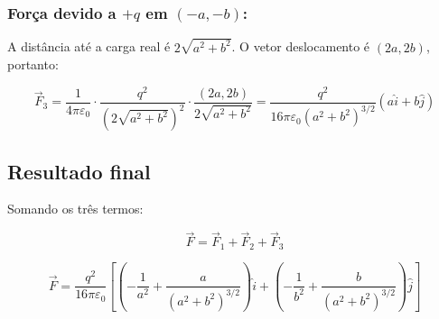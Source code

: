 \documentclass[a4paper,12pt]{article}
\begin{document}
\begin{flushleft}
\subsubsection*{Força devido a \(+q\) em \((-a, -b)\):}

A distância até a carga real é \(2\sqrt{a^2 + b^2}\). O vetor deslocamento é \((2a, 2b)\), portanto:

\begin{equation}
\vec{F}_3 = \frac{1}{4\pi\varepsilon_0} \cdot \frac{q^2}{(2\sqrt{a^2 + b^2})^2} \cdot \frac{(2a, 2b)}{2\sqrt{a^2 + b^2}} 
= \frac{q^2}{16\pi\varepsilon_0 (a^2 + b^2)^{3/2}} (a\hat{i} + b\hat{j})
\end{equation}

\subsection*{Resultado final}

Somando os três termos:

\begin{equation}
\vec{F} = \vec{F}_1 + \vec{F}_2 + \vec{F}_3
\end{equation}

\begin{equation}
\boxed{
\vec{F} = \frac{q^2}{16\pi \varepsilon_0} \left[
\left( -\frac{1}{a^2} + \frac{a}{(a^2 + b^2)^{3/2}} \right) \hat{i} +
\left( -\frac{1}{b^2} + \frac{b}{(a^2 + b^2)^{3/2}} \right) \hat{j}
\right]
}
\end{equation}

\end{flushleft}
\end{document}

